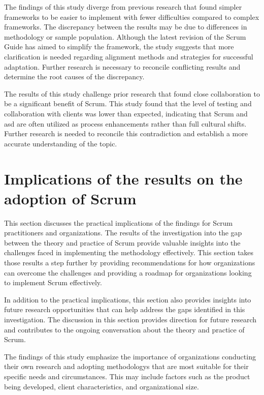 \newpage

The findings of this study diverge from previous research that found simpler \glspl{framework} to be easier to implement with fewer difficulties compared to complex \glspl{framework}. The discrepancy between the results may be due to differences in \gls{methodology} or sample population. Although the latest revision of the Scrum Guide has aimed to simplify the \gls{framework}, the study suggests that more clarification is needed regarding alignment \glspl{method} and strategies for successful \gls{adaptation}. Further research is necessary to reconcile conflicting results and determine the root causes of the discrepancy.

The results of this study challenge prior research that found close collaboration to be a significant benefit of Scrum. This study found that the level of testing and collaboration with \glspl{client} was lower than expected, indicating that Scrum and \ac{asd} are often utilized as process enhancements rather than full cultural shifts. Further research is needed to reconcile this contradiction and establish a more accurate understanding of the topic.

\section{Implications of the results on the adoption of Scrum}\label{sec:Implicationsoftheresults}
This section discusses the practical implications of the findings for Scrum practitioners and organizations. The results of the investigation into the gap between the theory and practice of Scrum provide valuable insights into the challenges faced in implementing the \gls{methodology} effectively. This section takes those results a step further by providing recommendations for how organizations can overcome the challenges and providing a roadmap for organizations looking to implement Scrum effectively.

In addition to the practical implications, this section also provides insights into future research opportunities that can help address the gaps identified in this investigation. The discussion in this section provides direction for future research and contributes to the ongoing conversation about the theory and practice of Scrum.

The findings of this study emphasize the importance of organizations conducting their own research and adopting \glspl{methodology} that are most suitable for their specific needs and circumstances. This may include factors such as the product being developed, \gls{client} characteristics, and organizational size.

